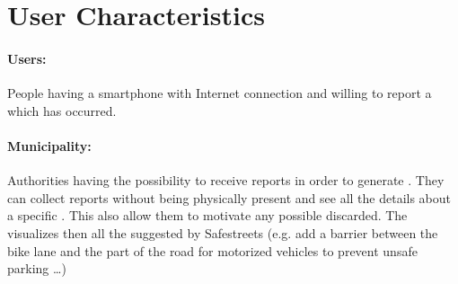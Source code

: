 \documentclass[../../rasd.tex]{subfiles}
\begin{document}
	
	\section{User Characteristics}

		\paragraph{Users:}
		People having a smartphone with Internet connection and willing to report a  which has occurred. 
		\paragraph{Municipality:}
		Authorities having the possibility to receive  reports in order to generate . They can collect reports without being physically present and see all the details about a specific . This also allow them to motivate any possible  discarded. The  visualizes then all the  suggested by Safestreets (e.g. add a barrier between the bike lane and the part of the road for motorized vehicles to prevent unsafe parking …) 
		
		
\end{document}
